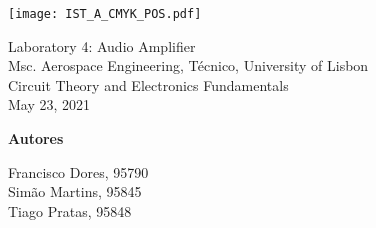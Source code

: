 \thispagestyle {empty}

\begin{titlepage}
\texttt{[image: IST\_A\_CMYK\_POS.pdf]}

\begin{center}
%
\vspace{1.0cm}

\vspace{5cm}
{\FontLb Laboratory 4: Audio Amplifier} \\
\vspace{1cm}
{\FontSn Msc. Aerospace Engineering, Técnico, University of Lisbon} \\
\vspace{1cm}
{\FontSn Circuit Theory and Electronics Fundamentals} \\
\vspace{1cm}
{\FontSn May 23, 2021} \\


\vspace{8cm}


\textbf{{Autores}\\[0.06in]}

Francisco Dores, 95790\\
Simão Martins, 95845\\
Tiago Pratas, 95848\\ 
\vspace{2cm}

\end{center}

\end{titlepage}

